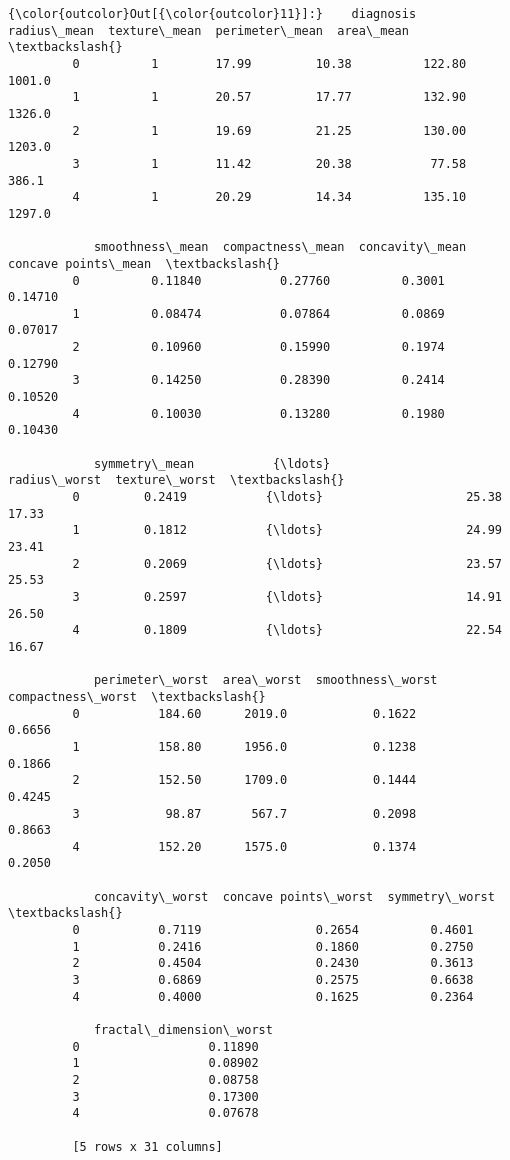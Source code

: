 \documentclass[11pt]{article}
\begin{document}
\begin{Verbatim}[commandchars=\\\{\}]
{\color{outcolor}Out[{\color{outcolor}11}]:}    diagnosis  radius\_mean  texture\_mean  perimeter\_mean  area\_mean  \textbackslash{}
         0          1        17.99         10.38          122.80     1001.0   
         1          1        20.57         17.77          132.90     1326.0   
         2          1        19.69         21.25          130.00     1203.0   
         3          1        11.42         20.38           77.58      386.1   
         4          1        20.29         14.34          135.10     1297.0   
         
            smoothness\_mean  compactness\_mean  concavity\_mean  concave points\_mean  \textbackslash{}
         0          0.11840           0.27760          0.3001              0.14710   
         1          0.08474           0.07864          0.0869              0.07017   
         2          0.10960           0.15990          0.1974              0.12790   
         3          0.14250           0.28390          0.2414              0.10520   
         4          0.10030           0.13280          0.1980              0.10430   
         
            symmetry\_mean           {\ldots}             radius\_worst  texture\_worst  \textbackslash{}
         0         0.2419           {\ldots}                    25.38          17.33   
         1         0.1812           {\ldots}                    24.99          23.41   
         2         0.2069           {\ldots}                    23.57          25.53   
         3         0.2597           {\ldots}                    14.91          26.50   
         4         0.1809           {\ldots}                    22.54          16.67   
         
            perimeter\_worst  area\_worst  smoothness\_worst  compactness\_worst  \textbackslash{}
         0           184.60      2019.0            0.1622             0.6656   
         1           158.80      1956.0            0.1238             0.1866   
         2           152.50      1709.0            0.1444             0.4245   
         3            98.87       567.7            0.2098             0.8663   
         4           152.20      1575.0            0.1374             0.2050   
         
            concavity\_worst  concave points\_worst  symmetry\_worst  \textbackslash{}
         0           0.7119                0.2654          0.4601   
         1           0.2416                0.1860          0.2750   
         2           0.4504                0.2430          0.3613   
         3           0.6869                0.2575          0.6638   
         4           0.4000                0.1625          0.2364   
         
            fractal\_dimension\_worst  
         0                  0.11890  
         1                  0.08902  
         2                  0.08758  
         3                  0.17300  
         4                  0.07678  
         
         [5 rows x 31 columns]
\end{Verbatim}
            
\end{document}
